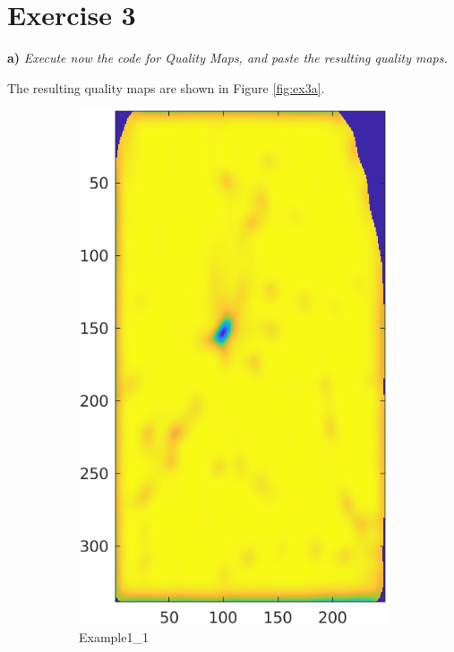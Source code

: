 \documentclass[11pt]{article}
\begin{document}
\section*{Exercise 3}

\textbf{a) }\emph{Execute now the code for Quality Maps, and paste the resulting quality maps.}

The resulting quality maps are shown in Figure \ref{fig:ex3a}.

\begin{figure}[h!]
  \centering
       \begin{subfigure}[t]{0.45\textwidth}
         \centering
         \includegraphics[scale=0.7]{img/qmap_1}
         \caption{Example1\_1}
     \end{subfigure}%
     \quad
     \begin{subfigure}[t]{0.45\textwidth}
         \centering

\end{subfigure}
\end{figure}
\end{document}
